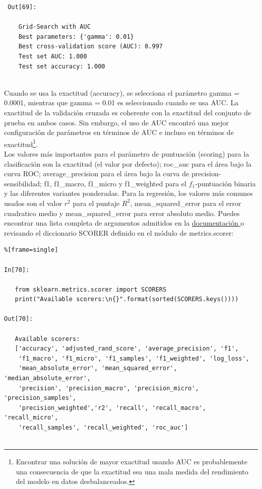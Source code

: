 {\begin{lstlisting}
 Out[69]:
 
    Grid-Search with AUC
    Best parameters: {'gamma': 0.01}
    Best cross-validation score (AUC): 0.997
    Test set AUC: 1.000
    Test set accuracy: 1.000
  
 \end{lstlisting}   Cuando se usa la exactitud (accuracy), se selecciona el parámetro {\ttfamily gamma = 0.0001}, mientras que {\ttfamily gamma = 0.01} es  seleccionado cuando se usa  AUC.  La  exactitud de la validación cruzada es coherente  con la exactitud  del conjunto de prueba  en ambos casos. Sin embargo, el uso de AUC encontró una mejor configuración de parámetros en  términos de AUC e incluso en términos de exactitud\footnote{\scriptsize	 Encontrar una solución de mayor exactitud usando AUC es probablemente una consecuencia de que la exactitud sea una mala medida del rendimiento del modelo en datos desbalanceados.}.\\
 
 
 Los valores más importantes para el parámetro de puntuación ({\ttfamily scoring}) para la clasificación son la exactitud (el valor por defecto); {\ttfamily roc\_auc} para el área bajo  la curva ROC; {\ttfamily average\_precision}  para el área bajo la curva de precision-sensibilidad; {\ttfamily  f1, f1\_macro, f1\_micro}  y  {\ttfamily  f1\_weighted } para el  $f_{1}$-puntuación binaria  y  las diferentes variantes ponderadas.   Para la regresión,  los valores  más comunes usados  son el valor $r^{2}$ para el puntaje $R^{2}$, {\ttfamily mean\_squared\_error} para el error cuadratico medio    y {\ttfamily mean\_squared\_error}  para error absoluto medio.  Puedes encontrar una lista completa de   argumentos admitidos en la   \href{https://scikit-learn.org/stable/modules/model_evaluation.html#the-scoring-parameter-defining-model-evaluation-rules}{\textcolor{vino}{documentación} } o revisando  el diccionario {\ttfamily SCORER}  definido en el módulo de {\ttfamily  metrics.scorer}:
 

 \begin{lstlisting}%[frame=single]
 
In[70]:

   from sklearn.metrics.scorer import SCORERS
   print("Available scorers:\n{}".format(sorted(SCORERS.keys())))
 
Out[70]:
 
   Available scorers:
   ['accuracy', 'adjusted_rand_score', 'average_precision', 'f1', 
    'f1_macro', 'f1_micro', 'f1_samples', 'f1_weighted', 'log_loss',
    'mean_absolute_error', 'mean_squared_error', 'median_absolute_error',
    'precision', 'precision_macro', 'precision_micro', 'precision_samples',
    'precision_weighted','r2', 'recall', 'recall_macro', 'recall_micro',
    'recall_samples', 'recall_weighted', 'roc_auc']


\end{lstlisting}}
